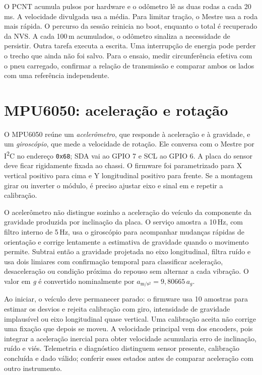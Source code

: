 O PCNT acumula pulsos por hardware e o odômetro lê as duas rodas a cada 20\,ms. A velocidade divulgada usa a média. Para limitar tração, o Mestre usa a roda mais rápida. O percurso da sessão reinicia no boot, enquanto o total é recuperado da NVS. A cada 100\,m acumulados, o odômetro sinaliza a necessidade de persistir. Outra tarefa executa a escrita. Uma interrupção de energia pode perder o trecho que ainda não foi salvo. Para o ensaio, medir circunferência efetiva com o pneu carregado, confirmar a relação de transmissão e comparar ambos os lados com uma referência independente.

\section{MPU6050: aceleração e rotação}
O MPU6050 reúne um \emph{acelerômetro}, que responde à aceleração e à gravidade, e um \emph{giroscópio}, que mede a velocidade de rotação. Ele conversa com o Mestre por I\textsuperscript{2}C no endereço \texttt{0x68}; SDA vai ao GPIO 7 e SCL ao GPIO 6. A placa do sensor deve ficar rigidamente fixada ao chassi. O firmware foi parametrizado para X vertical positivo para cima e Y longitudinal positivo para frente. Se a montagem girar ou inverter o módulo, é preciso ajustar eixo e sinal em  e repetir a calibração.

O acelerômetro não distingue sozinho a aceleração do veículo da componente da gravidade produzida por inclinação da placa. O serviço amostra a 10\,Hz, com filtro interno de 5\,Hz, usa o giroscópio para acompanhar mudanças rápidas de orientação e corrige lentamente a estimativa de gravidade quando o movimento permite. Subtrai então a gravidade projetada no eixo longitudinal, filtra ruído e usa dois limiares com confirmação temporal para classificar aceleração, desaceleração ou condição próxima do repouso sem alternar a cada vibração. O valor em \emph{g} é convertido nominalmente por $a_{\mathrm{m/s^2}}=9{,}80665\,a_g$.

Ao iniciar, o veículo deve permanecer parado: o firmware usa 10 amostras para estimar os desvios e rejeita calibração com giro, intensidade de gravidade implausível ou eixo longitudinal quase vertical. Uma calibração aceita não corrige uma fixação que depois se moveu. A velocidade principal vem dos encoders, pois integrar a aceleração inercial para obter velocidade acumularia erro de inclinação, ruído e viés. Telemetria e diagnóstico distinguem sensor presente, calibração concluída e dado válido; conferir esses estados antes de comparar aceleração com outro instrumento.

